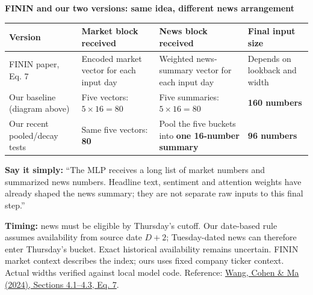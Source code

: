\documentclass[11pt,a4paper,landscape]{article}
\newcommand{\sub}[1]{{\large\bfseries\color{navy}#1}\par}
\newcommand{\callout}[1]{\par\colorbox{pale}{\parbox{\dimexpr\linewidth-2\fboxsep}{\vspace{5pt}#1\vspace{5pt}}}\par}
\begin{document}
\begin{center}
\end{center}

\sub{FININ and our two versions: same idea, different news arrangement}
{\small
\begin{tabularx}{\linewidth}{@{}P{4cm}YYP{3.4cm}@{}}
\toprule
\textbf{Version} & \textbf{Market block received} & \textbf{News block received} & \textbf{Final input size}\\\midrule
FININ paper, Eq. 7 & Encoded market vector for each input day & Weighted news-summary vector for each input day & Depends on lookback and width\\
Our baseline (diagram above) & Five vectors: $5\times16=80$ & Five summaries: $5\times16=80$ & \textbf{160 numbers}\\
Our recent pooled/decay tests & Same five vectors: \textbf{80} & Pool the five buckets into \textbf{one 16-number summary} & \textbf{96 numbers}\\\bottomrule
\end{tabularx}
}
\callout{\textbf{Say it simply:} ``The MLP receives a long list of market numbers and summarized news numbers. Headline text, sentiment and attention weights have already shaped the news summary; they are not separate raw inputs to this final step.''}
{\small\textbf{Timing:} news must be eligible by Thursday's cutoff. Our date-based rule assumes availability from source date $D+2$; Tuesday-dated news can therefore enter Thursday's bucket. Exact historical availability remains uncertain.}
\vfill
{\scriptsize\color{slate}FININ market context describes the index; ours uses fixed company ticker context. Actual widths verified against local model code. Reference: \href{https://aclanthology.org/2024.findings-emnlp.189.pdf}{Wang, Cohen \& Ma (2024), Sections 4.1--4.3, Eq. 7}.}
\end{document}
